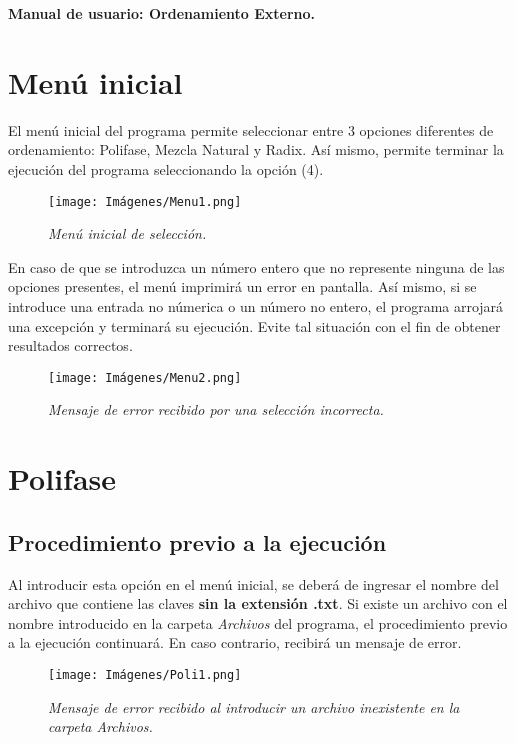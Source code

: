 \documentclass[letterpaper,12pt]{extarticle}
\begin{document}
\centering\Large\textbf{Manual de usuario: Ordenamiento Externo.}

\justifying\normalsize	
\section{Menú inicial}

 \noindent El menú inicial del programa permite seleccionar entre 3 opciones diferentes de ordenamiento: Polifase, Mezcla Natural y Radix. Así mismo, permite terminar la ejecución del programa seleccionando la opción (4).

\begin{figure}[h!]
\centering
\texttt{[image: Imágenes/Menu1.png]}
\caption{\textit{Menú inicial de selección.}}
\label{fig:Menu1}
\end{figure}

En caso de que se introduzca un número entero que no represente ninguna de las opciones presentes, el menú imprimirá un error en pantalla. Así mismo, si se introduce una entrada no númerica o un número no entero, el programa arrojará una excepción y terminará su ejecución. Evite tal situación con el fin de obtener resultados correctos.

\begin{figure}[h!]
\centering
\texttt{[image: Imágenes/Menu2.png]}
\caption{\textit{Mensaje de error recibido por una selección incorrecta.}}
\label{fig:Menu2}
\end{figure}

\section{Polifase}

\subsection{Procedimiento previo a la ejecución}
\label{section:2.1}

\noindent Al introducir esta opción en el menú inicial, se deberá de ingresar el nombre del archivo que contiene las claves \textbf{sin la extensión .txt}. Si existe un archivo con el nombre introducido en la carpeta \textit{Archivos} del programa, el procedimiento previo a la ejecución continuará. En caso contrario, recibirá un mensaje de error.


\begin{figure}[h!]
\centering
\texttt{[image: Imágenes/Poli1.png]}
\caption{\textit{Mensaje de error recibido al introducir un archivo inexistente en la carpeta Archivos.}}
\label{fig:Poli1}
\end{figure}
\end{document}
